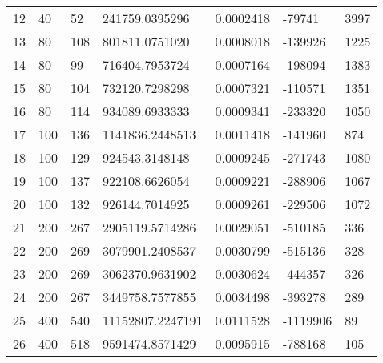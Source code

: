 \begin{longtable}{lllllll}
    12               & 40             & 52             & 241759.0395296        & 0.0002418        & -79741          & 3997                 \\
    13               & 80             & 108            & 801811.0751020        & 0.0008018        & -139926         & 1225                 \\
    14               & 80             & 99             & 716404.7953724        & 0.0007164        & -198094         & 1383                 \\
    15               & 80             & 104            & 732120.7298298        & 0.0007321        & -110571         & 1351                 \\
    16               & 80             & 114            & 934089.6933333        & 0.0009341        & -233320         & 1050                 \\
    17               & 100            & 136            & 1141836.2448513       & 0.0011418        & -141960         & 874                  \\
    18               & 100            & 129            & 924543.3148148        & 0.0009245        & -271743         & 1080                 \\
    19               & 100            & 137            & 922108.6626054        & 0.0009221        & -288906         & 1067                 \\
    20               & 100            & 132            & 926144.7014925        & 0.0009261        & -229506         & 1072                 \\
    21               & 200            & 267            & 2905119.5714286       & 0.0029051        & -510185         & 336                  \\
    22               & 200            & 269            & 3079901.2408537       & 0.0030799        & -515136         & 328                  \\
    23               & 200            & 269            & 3062370.9631902       & 0.0030624        & -444357         & 326                  \\
    24               & 200            & 267            & 3449758.7577855       & 0.0034498        & -393278         & 289                  \\
    25               & 400            & 540            & 11152807.2247191      & 0.0111528        & -1119906        & 89                   \\
    26               & 400            & 518            & 9591474.8571429       & 0.0095915        & -788168         & 105                  \\

\end{longtable}
